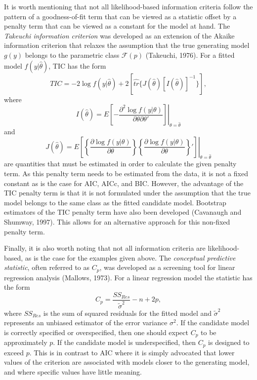		It is worth mentioning that not all likelihood-based information criteria follow the pattern of a goodness-of-fit term that can be viewed as a statistic offset by a penalty term that
		can be viewed as a constant for the model at hand. The \textit{Takeuchi information criterion} was developed as an extension of the Akaike information criterion that relaxes the
		assumption that the true generating model $g(y)$ belongs to the parametric class $\mathcal{F}(p)$ (Takeuchi, 1976). For a fitted model $f(y|\hat{\theta})$, TIC has the form
		\begin{equation*}
			TIC = -2 \log f(y|\hat{\theta}) + 2 \left[ \hat{tr} \{ J(\hat{\theta}) [I(\hat{\theta})]^{-1} \} \right] ,
		\end{equation*}
		where
		\begin{equation*}
			I(\hat{\theta}) = E \left. \left[ -\frac{\partial^2 \log f(y|\theta)}{\partial \theta \partial \theta '} \right] \right|_{\theta = \hat{\theta}}
		\end{equation*}
		and
		\begin{equation*}
			J(\hat{\theta}) = E \left. \left[ \left\{ \frac{\partial \log f(y|\theta)}{\partial \theta} \right\} \left\{ \frac{\partial \log f(y|\theta)}{\partial \theta} \right\}'  \right] \right|_{\theta = \hat{\theta}}
		\end{equation*}
		are quantities that must be estimated in order to calculate the given penalty term. As this penalty term needs to be estimated from the data, it is not a fixed constant as is the case
		for AIC, AICc, and BIC. However, the advantage of the TIC penalty term is that it is not formulated under the assumption that the true model belongs to the same class as the fitted candidate
		model. Bootstrap estimators of the TIC penalty term have also been developed (Cavanaugh and Shumway, 1997). This allows for an alternative approach for this non-fixed penalty term.

		Finally, it is also worth noting that not all information criteria are likelihood-based, as is the case for the examples given above. The \textit{conceptual predictive statistic}, often
		referred to as $C_p$, was developed as a screening tool for linear regression analysis (Mallows, 1973). For a linear regression model the statistic has the form
		\begin{equation*}
			C_p = \frac{SS_{Res}}{\tilde{\sigma}^2} - n + 2p ,
		\end{equation*}
		where $SS_{Res}$ is the sum of squared residuals for the fitted model and $\tilde{\sigma}^2$ represents an unbiased estimator of the error variance $\sigma^2$. If the candidate model is correctly
		specified or overspecified, then one should expect $C_p$ to be approximately $p$. If the candidate model is underspecified, then $C_p$ is designed to exceed $p$. This is in contrast to AIC
		where it is simply advocated that lower values of the criterion are associated with models closer to the generating model, and where specific values have little meaning.
		
